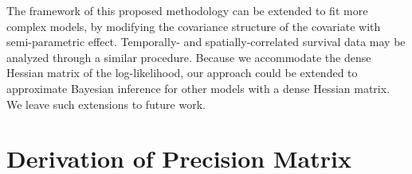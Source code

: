 \documentclass[num-refs,serif,10pt]{wiley-article}
\begin{document}
The framework of this proposed methodology can be extended to fit more complex models, by modifying the covariance structure of the covariate with semi-parametric effect. Temporally- and spatially-correlated survival data may be analyzed through a similar procedure. Because we accommodate the dense Hessian matrix of the log-likelihood, our approach could be extended to approximate Bayesian inference for other models with a dense Hessian matrix. We leave such extensions to future work.



\appendix

\section{Derivation of Precision Matrix}
\end{document}
